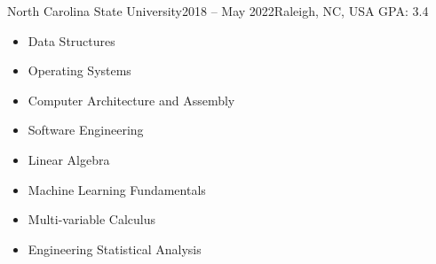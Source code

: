 

{North Carolina State University}{2018 -- May 2022}{Raleigh, NC, USA}
GPA: 3.4



\begin{itemize}
\item Data Structures
\item Operating Systems
\item Computer Architecture and Assembly
\item Software Engineering
\item Linear Algebra
\item Machine Learning Fundamentals
\item Multi-variable Calculus
\item Engineering Statistical Analysis
\end{itemize}